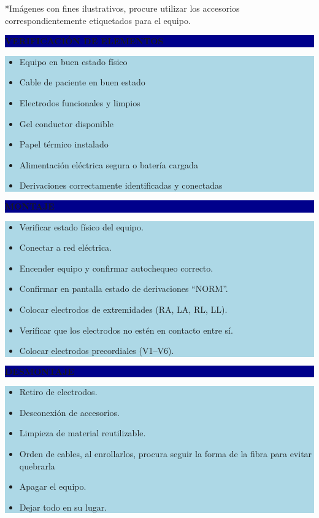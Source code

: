 \documentclass[11pt]{article}
\newcommand{\seccionbanda}[1]{%
  \vspace{0.6em}
  \noindent\colorbox{darkblue}{\parbox{\dimexpr\linewidth-2\fboxsep}{%
    \centering\color{white}\bfseries #1}}\par\vspace{0.6em}
}
\begin{document}
\vspace{0.5em}
\footnotesize{*Imágenes con fines ilustrativos, procure utilizar los accesorios correspondientemente etiquetados para el equipo.}
\normalsize

\newpage
\seccionbanda{VERIFICACIÓN DE ELEMENTOS}
\noindent\colorbox{lightblue}{\parbox{\dimexpr\linewidth-2\fboxsep\relax}{%
\begin{itemize}[label=$\square$, itemsep=4pt]
\item Equipo en buen estado físico
\item Cable de paciente en buen estado
\item Electrodos funcionales y limpios
\item Gel conductor disponible
\item Papel térmico instalado
\item Alimentación eléctrica segura o batería cargada
\item Derivaciones correctamente identificadas y conectadas
\end{itemize}
}}\par

\seccionbanda{MONTAJE}
\noindent\colorbox{lightblue}{\parbox{\dimexpr\linewidth-2\fboxsep\relax}{%
\begin{itemize}[label=$\square$, itemsep=4pt]
\item Verificar estado físico del equipo.
\item Conectar a red eléctrica.
\item Encender equipo y confirmar autochequeo correcto.
\item Confirmar en pantalla estado de derivaciones ``NORM''.
\item Colocar electrodos de extremidades (RA, LA, RL, LL).
\item Verificar que los electrodos no estén en contacto entre sí.
\item Colocar electrodos precordiales (V1--V6).
\end{itemize}
}}\par

\seccionbanda{DESMONTAJE}
\noindent\colorbox{lightblue}{\parbox{\dimexpr\linewidth-2\fboxsep\relax}{%
\begin{itemize}[label=$\square$, itemsep=4pt]
\item Retiro de electrodos.
\item Desconexión de accesorios.
\item Limpieza de material reutilizable.
\item Orden de cables, al enrollarlos, procura seguir la forma de la fibra para evitar quebrarla
\item Apagar el equipo.
\item Dejar todo en su lugar.
\end{itemize}
}}\par
\end{document}
